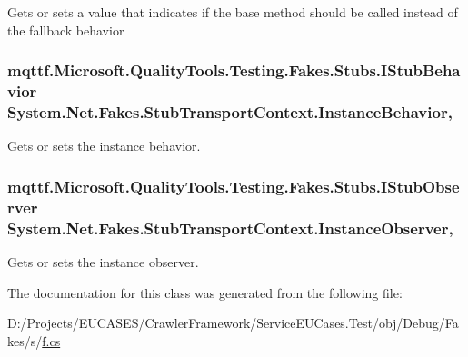 Gets or sets a value that indicates if the base method should be called instead of the fallback behavior

\hypertarget{class_system_1_1_net_1_1_fakes_1_1_stub_transport_context_ab626823e3538e16fed231bf4c712eadc}{
\subsubsection[{Instance\-Behavior}]{\setlength{\rightskip}{0pt plus 5cm}mqttf.\-Microsoft.\-Quality\-Tools.\-Testing.\-Fakes.\-Stubs.\-I\-Stub\-Behavior System.\-Net.\-Fakes.\-Stub\-Transport\-Context.\-Instance\-Behavior\hspace{0.3cm}{\ttfamily [get]}, {\ttfamily [set]}}}\label{class_system_1_1_net_1_1_fakes_1_1_stub_transport_context_ab626823e3538e16fed231bf4c712eadc}


Gets or sets the instance behavior.

\hypertarget{class_system_1_1_net_1_1_fakes_1_1_stub_transport_context_a2386bc6b9a5e2135df5d6df73b7261da}{
\subsubsection[{Instance\-Observer}]{\setlength{\rightskip}{0pt plus 5cm}mqttf.\-Microsoft.\-Quality\-Tools.\-Testing.\-Fakes.\-Stubs.\-I\-Stub\-Observer System.\-Net.\-Fakes.\-Stub\-Transport\-Context.\-Instance\-Observer\hspace{0.3cm}{\ttfamily [get]}, {\ttfamily [set]}}}\label{class_system_1_1_net_1_1_fakes_1_1_stub_transport_context_a2386bc6b9a5e2135df5d6df73b7261da}


Gets or sets the instance observer.



The documentation for this class was generated from the following file\-:\begin{DoxyCompactItemize}
\item 
D\-:/\-Projects/\-E\-U\-C\-A\-S\-E\-S/\-Crawler\-Framework/\-Service\-E\-U\-Cases.\-Test/obj/\-Debug/\-Fakes/s/\hyperlink{s_2f_8cs}{f.\-cs}\end{DoxyCompactItemize}
